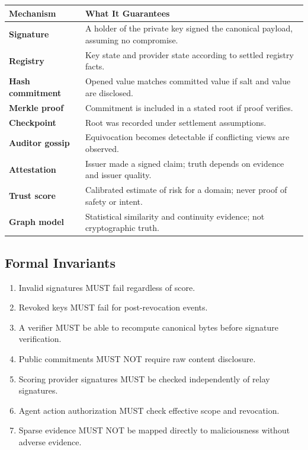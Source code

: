 \documentclass[11pt]{article}
\begin{document}
\begin{center}
\begin{tabularx}{\textwidth}{>{\bfseries}p{} X}
\toprule
Mechanism & What It Guarantees \\
\midrule
Signature & A holder of the private key signed the canonical payload, assuming no compromise. \\
Registry & Key state and provider state according to settled registry facts. \\
Hash commitment & Opened value matches committed value if salt and value are disclosed. \\
Merkle proof & Commitment is included in a stated root if proof verifies. \\
Checkpoint & Root was recorded under settlement assumptions. \\
Auditor gossip & Equivocation becomes detectable if conflicting views are observed. \\
Attestation & Issuer made a signed claim; truth depends on evidence and issuer quality. \\
Trust score & Calibrated estimate of risk for a domain; never proof of safety or intent. \\
Graph model & Statistical similarity and continuity evidence; not cryptographic truth. \\
\bottomrule
\end{tabularx}
\end{center}

\subsection{Formal Invariants}

\begin{enumerate}
    \item Invalid signatures MUST fail regardless of score.
    \item Revoked keys MUST fail for post-revocation events.
    \item A verifier MUST be able to recompute canonical bytes before signature verification.
    \item Public commitments MUST NOT require raw content disclosure.
    \item Scoring provider signatures MUST be checked independently of relay signatures.
    \item Agent action authorization MUST check effective scope and revocation.
    \item Sparse evidence MUST NOT be mapped directly to maliciousness without adverse evidence.
\end{enumerate}
\end{document}
